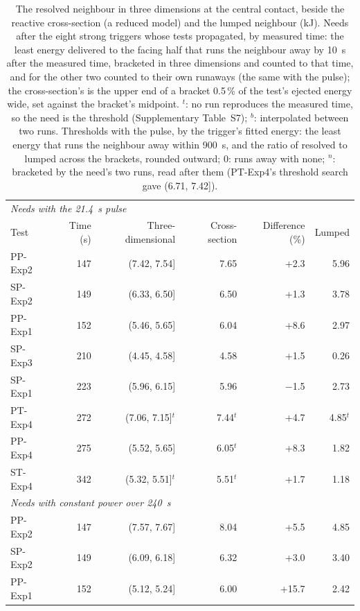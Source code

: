 \begin{table}[!tbp]
\centering
\scriptsize
\caption{The resolved neighbour in three dimensions at the central contact, beside the reactive cross-section (a reduced model) and the lumped neighbour (kJ). Needs after the eight strong triggers whose tests propagated, by measured time: the least energy delivered to the facing half that runs the neighbour away by 10~s after the measured time, bracketed in three dimensions and counted to that time, and for the other two counted to their own runaways (the same with the pulse); the cross-section's is the upper end of a bracket 0.5\,\% of the test's ejected energy wide, set against the bracket's midpoint. $^{t}$: no run reproduces the measured time, so the need is the threshold (Supplementary Table~S7); $^{b}$: interpolated between two runs. Thresholds with the pulse, by the trigger's fitted energy: the least energy that runs the neighbour away within 900~s, and the ratio of resolved to lumped across the brackets, rounded outward; 0: runs away with none; $^{n}$: bracketed by the need's two runs, read after them (PT-Exp4's threshold search gave (6.71, 7.42]).}
\label{tab:3d}
\setlength{\tabcolsep}{4pt}
\begin{tabular}{lrrrrr}
\toprule
\multicolumn{6}{l}{\textit{Needs with the 21.4~s pulse}} \\
Test & Time (s) & Three-dimensional & Cross-section & Difference (\%) & Lumped \\
\midrule
PP-Exp2 & 147 & (7.42, 7.54] & 7.65 & +2.3 & 5.96 \\
SP-Exp2 & 149 & (6.33, 6.50] & 6.50 & +1.3 & 3.78 \\
PP-Exp1 & 152 & (5.46, 5.65] & 6.04 & +8.6 & 2.97 \\
SP-Exp3 & 210 & (4.45, 4.58] & 4.58 & +1.5 & 0.26 \\
SP-Exp1 & 223 & (5.96, 6.15] & 5.96 & $-$1.5 & 2.73 \\
PT-Exp4 & 272 & (7.06, 7.15]$^{t}$ & 7.44$^{t}$ & +4.7 & 4.85$^{t}$ \\
PP-Exp4 & 275 & (5.52, 5.65] & 6.05$^{t}$ & +8.3 & 1.82 \\
ST-Exp4 & 342 & (5.32, 5.51]$^{t}$ & 5.51$^{t}$ & +1.7 & 1.18 \\
\midrule
\multicolumn{6}{l}{\textit{Needs with constant power over 240~s}} \\
PP-Exp2 & 147 & (7.57, 7.67] & 8.04 & +5.5 & 4.85 \\
SP-Exp2 & 149 & (6.09, 6.18] & 6.32 & +3.0 & 3.40 \\
PP-Exp1 & 152 & (5.12, 5.24] & 6.00 & +15.7 & 2.42 \\

\end{tabular}
\end{table}
